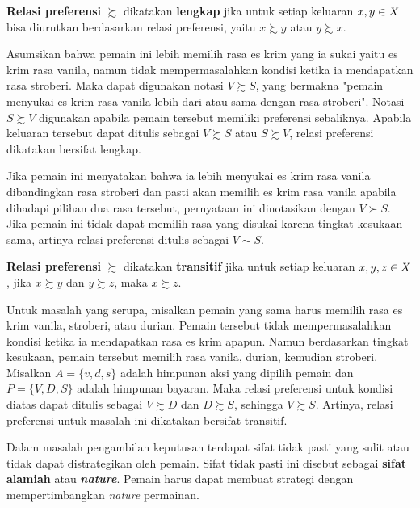 \begin{aksioma}
    \textbf{Relasi preferensi} $\succsim$ dikatakan \textbf{lengkap} jika untuk setiap keluaran $x,\space y \in X$ bisa diurutkan berdasarkan relasi preferensi, yaitu $x \succsim y$ atau $y \succsim x$.
\end{aksioma}

Asumsikan bahwa pemain ini lebih memilih rasa es krim yang ia sukai yaitu es krim rasa vanila, namun tidak mempermasalahkan kondisi ketika ia mendapatkan rasa stroberi. Maka dapat digunakan notasi $V \succsim S$, yang bermakna "pemain menyukai es krim rasa vanila lebih dari atau sama dengan rasa stroberi". Notasi $S \succsim V$ digunakan apabila pemain tersebut memiliki preferensi sebaliknya.
Apabila keluaran tersebut dapat ditulis sebagai $V \succsim S$ atau $S \succsim V$, relasi preferensi dikatakan bersifat lengkap.

Jika pemain ini menyatakan bahwa ia lebih menyukai es krim rasa vanila dibandingkan rasa stroberi dan pasti akan memilih es krim rasa vanila apabila dihadapi pilihan dua rasa tersebut, pernyataan ini dinotasikan dengan $V \succ S$. Jika pemain ini tidak dapat memilih rasa yang disukai karena tingkat kesukaan sama, artinya relasi preferensi ditulis sebagai $V \sim S$.

\begin{aksioma}
    \textbf{Relasi preferensi} $\succsim$ dikatakan \textbf{transitif} jika untuk setiap keluaran $x,\space y, \space z \in X$, jika $x \succsim y$ dan $y \succsim z$, maka $x \succsim z$.
\end{aksioma}

Untuk masalah yang serupa, misalkan pemain yang sama harus memilih rasa es krim vanila, stroberi, atau durian. Pemain tersebut tidak mempermasalahkan kondisi ketika ia mendapatkan rasa es krim apapun.
Namun berdasarkan tingkat kesukaan, pemain tersebut memilih rasa vanila, durian, kemudian stroberi. Misalkan $A = \lbrace v, d, s\rbrace$ adalah himpunan aksi yang dipilih pemain  dan $P = \lbrace V, D, S\rbrace$ adalah himpunan bayaran. Maka relasi preferensi untuk kondisi diatas dapat ditulis sebagai $V \succsim D$ dan $D \succsim S$, sehingga $V \succsim S$. Artinya, relasi preferensi untuk masalah ini dikatakan bersifat transitif.

Dalam masalah pengambilan keputusan terdapat sifat tidak pasti yang sulit atau tidak dapat distrategikan oleh pemain. Sifat tidak pasti ini disebut sebagai \textbf{sifat alamiah} atau \textbf{\textit{nature}}. Pemain harus dapat membuat strategi dengan mempertimbangkan \textit{nature} permainan.


